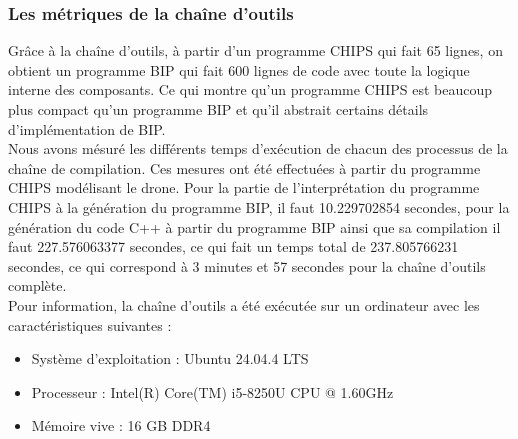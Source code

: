 \newpage

\subsubsection{Les métriques de la chaîne d'outils}
\label{metrique_toolchain}

Grâce à la chaîne d'outils, à partir d'un programme CHIPS qui fait 65 lignes, on obtient un programme BIP qui fait 600 lignes de code avec toute la logique interne des composants. Ce qui montre qu'un programme CHIPS est beaucoup plus compact qu'un programme BIP et qu'il abstrait certains détails d'implémentation de BIP. \\

Nous avons mésuré les différents temps d'exécution de chacun des processus de la chaîne de compilation. Ces mesures ont été effectuées à partir du programme CHIPS modélisant le drone. Pour la partie de l'interprétation du programme CHIPS à la génération du programme BIP, il faut 10.229702854 secondes, pour la génération du code C++ à partir du programme BIP ainsi que sa compilation il faut 227.576063377 secondes, ce qui fait un temps total de 237.805766231 secondes, ce qui correspond à 3 minutes et 57 secondes pour la chaîne d'outils complète. \\

Pour information, la chaîne d'outils a été exécutée sur un ordinateur avec les caractéristiques suivantes :
\begin{itemize}
    \item Système d'exploitation : Ubuntu 24.04.4 LTS
    \item Processeur : Intel(R) Core(TM) i5-8250U CPU @ 1.60GHz
    \item Mémoire vive : 16 GB DDR4
\end{itemize}

\FloatBarrier

\newpage